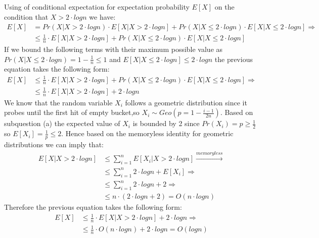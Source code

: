 \documentclass[11pt]{537homework}
\begin{document}
\subsection{}
Using of conditional expectation for expectation probability $E[X]$ on the condition that $X > 2 \cdot logn$ we have:
\begin{align*}
    E[X] &= Pr(X | X > 2 \cdot logn)\cdot E[X|X > 2 \cdot logn] + Pr(X | X \leq 2 \cdot logn) \cdot E[X | X \leq 2 \cdot logn] \Longrightarrow \\
    &\leq \frac{1}{n} \cdot E[X|X > 2 \cdot logn] + Pr(X | X \leq 2 \cdot logn) \cdot E[X | X \leq 2 \cdot logn]
\end{align*}
If we bound the following terms with their maximum possible value as $Pr(X | X \leq 2 \cdot logn) = 1 - \frac{1}{n} \leq 1$ and $E[X | X \leq 2 \cdot logn] \leq 2 \cdot logn$ the previous equation takes the following form:
\begin{align*}
    E[X] &\leq \frac{1}{n} \cdot E[X|X > 2 \cdot logn] + Pr(X | X \leq 2 \cdot logn) \cdot E[X | X \leq 2 \cdot logn] \Longrightarrow \\ 
    &\leq \frac{1}{n} \cdot E[X|X > 2 \cdot logn] + 2\cdot logn
\end{align*}
We know that the random variable $X_i$ follows a geometric distribution since it probes until the first hit of empty bucket,so $X_i \sim Geo(p = 1 -\frac{i-1}{2n})$. Based on subquestion (a) the expected value of $X_i$ is bounded by 2 since $Pr(X_i) = p  \geq \frac{1}{2}$ so $E[X_i] = \frac{1}{p} \leq 2$. Hence based on the memoryless identity for geometric distributions we can imply that: 
\begin{align*}
 E[X|X > 2 \cdot logn] &\leq \sum_{i=1}^{n} E[X_i|X > 2 \cdot logn] \xrightarrow{\textit{memoryless}} \\
 &\leq \sum_{i=1}^{n} 2 \cdot logn + E[X_i] \Longrightarrow \\
 &\leq \sum_{i=1}^{n} 2 \cdot logn + 2 \Longrightarrow \\
 &\leq n \cdot (2 \cdot logn + 2) = O(n \cdot logn)
\end{align*}
Therefore the previous equation takes the following form:
\begin{align*}
    E[X] &\leq \frac{1}{n} \cdot E[X|X > 2 \cdot logn] + 2\cdot logn \Longrightarrow \\
      &\leq \frac{1}{n} \cdot O(n \cdot logn) + 2\cdot logn = O(logn)
\end{align*}
\end{document}
